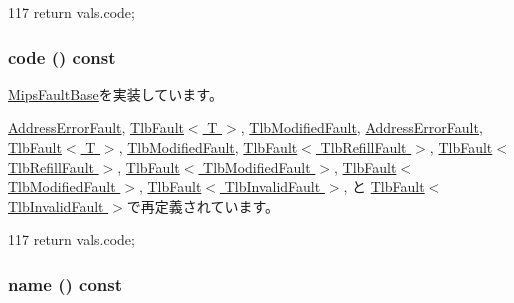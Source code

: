 \begin{DoxyCode}
117 { return vals.code; }
\end{DoxyCode}
\hypertarget{classMipsISA_1_1MipsFault_a1dd20a2460d7723d3eaa287b7cc07e79}{
\subsubsection[{code}]{ code () const}}
\label{classMipsISA_1_1MipsFault_a1dd20a2460d7723d3eaa287b7cc07e79}


\hyperlink{classMipsISA_1_1MipsFaultBase_a61bd3af5e2aa0d5447807e9fe98769be}{MipsFaultBase}を実装しています。

\hyperlink{classMipsISA_1_1AddressErrorFault_a1dd20a2460d7723d3eaa287b7cc07e79}{AddressErrorFault}, \hyperlink{classMipsISA_1_1TlbFault_a1dd20a2460d7723d3eaa287b7cc07e79}{TlbFault$<$ T $>$}, \hyperlink{classMipsISA_1_1TlbModifiedFault_a1dd20a2460d7723d3eaa287b7cc07e79}{TlbModifiedFault}, \hyperlink{classMipsISA_1_1AddressErrorFault_a1dd20a2460d7723d3eaa287b7cc07e79}{AddressErrorFault}, \hyperlink{classMipsISA_1_1TlbFault_a1dd20a2460d7723d3eaa287b7cc07e79}{TlbFault$<$ T $>$}, \hyperlink{classMipsISA_1_1TlbModifiedFault_a1dd20a2460d7723d3eaa287b7cc07e79}{TlbModifiedFault}, \hyperlink{classMipsISA_1_1TlbFault_a1dd20a2460d7723d3eaa287b7cc07e79}{TlbFault$<$ TlbRefillFault $>$}, \hyperlink{classMipsISA_1_1TlbFault_a1dd20a2460d7723d3eaa287b7cc07e79}{TlbFault$<$ TlbRefillFault $>$}, \hyperlink{classMipsISA_1_1TlbFault_a1dd20a2460d7723d3eaa287b7cc07e79}{TlbFault$<$ TlbModifiedFault $>$}, \hyperlink{classMipsISA_1_1TlbFault_a1dd20a2460d7723d3eaa287b7cc07e79}{TlbFault$<$ TlbModifiedFault $>$}, \hyperlink{classMipsISA_1_1TlbFault_a1dd20a2460d7723d3eaa287b7cc07e79}{TlbFault$<$ TlbInvalidFault $>$}, と \hyperlink{classMipsISA_1_1TlbFault_a1dd20a2460d7723d3eaa287b7cc07e79}{TlbFault$<$ TlbInvalidFault $>$}で再定義されています。


\begin{DoxyCode}
117 { return vals.code; }
\end{DoxyCode}
\hypertarget{classMipsISA_1_1MipsFault_a73adb23259baf912a81683a9790a303f}{
\subsubsection[{name}]{ name () const}}
\label{classMipsISA_1_1MipsFault_a73adb23259baf912a81683a9790a303f}


